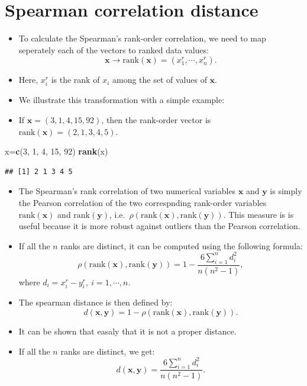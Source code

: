 \documentclass[
]{article}
\newenvironment{Shaded}{\begin{snugshade}}{\end{snugshade}}
\newcommand{\DecValTok}[1]{\textcolor[rgb]{0.00,0.00,0.81}{#1}}
\newcommand{\KeywordTok}[1]{\textcolor[rgb]{0.13,0.29,0.53}{\textbf{#1}}}
\newcommand{\NormalTok}[1]{#1}
\providecommand{\tightlist}{%
  \setlength{\itemsep}{0pt}\setlength{\parskip}{0pt}}
\begin{document}
\hypertarget{spearman-correlation-distance}{%
\section{Spearman correlation
distance}\label{spearman-correlation-distance}}

\begin{itemize}
\tightlist
\item
  To calculate the Spearman's rank-order correlation, we need to map
  seperately each of the vectors to ranked data values:
  \[\mathbf{x}\rightarrow \text{rank}(\mathbf{x})=(x_1^r,\cdots,x_n^r).\]
\item
  Here, \(x_i^r\) is the rank of \(x_i\) among the set of values of
  \(\mathbf{x}\).
\item
  We illustrate this transformation with a simple example:
\item
  If \(\mathbf{x}=(3, 1, 4, 15, 92)\), then the rank-order vector is
  \(\text{rank}(\mathbf{x})=(2,1,3,4,5)\).
\end{itemize}

\begin{Shaded}
\begin{Highlighting}[]
\NormalTok{x=}\KeywordTok{c}\NormalTok{(}\DecValTok{3}\NormalTok{, }\DecValTok{1}\NormalTok{, }\DecValTok{4}\NormalTok{, }\DecValTok{15}\NormalTok{, }\DecValTok{92}\NormalTok{)}
\KeywordTok{rank}\NormalTok{(x)}
\end{Highlighting}
\end{Shaded}

\begin{verbatim}
## [1] 2 1 3 4 5
\end{verbatim}

\begin{itemize}
\tightlist
\item
  The Spearman's rank correlation of two numerical variables
  \(\mathbf{x}\) and \(\mathbf{y}\) is simply the Pearson correlation of
  the two correspnding rank-order variables \(\text{rank}(\mathbf{x})\)
  and \(\text{rank}(\mathbf{y})\),
  i.e.~\(\rho(\text{rank}(\mathbf{x}),\text{rank}(\mathbf{y}))\). This
  measure is is useful because it is more robust against outliers than
  the Pearson correlation.
\item
  If all the \(n\) ranks are distinct, it can be computed using the
  following formula: \[
  \rho(\text{rank}(\mathbf{x}),\text{rank}(\mathbf{y}))=1-\frac{6\sum_{i=1}^n d_i^2}{n(n^2-1)},
  \] where \(d_i=x_i^r-y_i^r,\:i=1,\cdots,n\).
\item
  The spearman distance is then defined by: \[
  d(\mathbf{x},\mathbf{y})=1-\rho(\text{rank}(\mathbf{x}),\text{rank}(\mathbf{y})).
  \]
\item
  It can be shown that easaly that it is not a proper distance.
\item
  If all the \(n\) ranks are distinct, we get: \[
  d(\mathbf{x},\mathbf{y})=\frac{6\sum_{i=1}^n d_i^2}{n(n^2-1)}.
  \]
\end{itemize}
\end{document}
